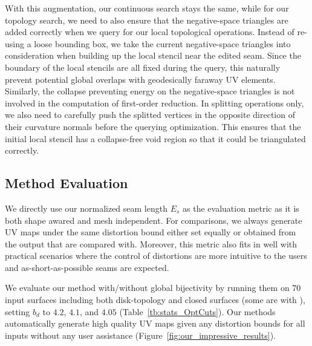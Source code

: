 With this augmentation, our continuous search stays the same, while for our topology search, we need to also ensure that the negative-space triangles are added correctly when we query for our local topological operations.
Instead of re-using a loose bounding box, we take the current negative-space triangles into consideration when building up the local stencil near the edited seam. Since the boundary of the local stencils are all fixed during the query, this naturally prevent potential global overlaps with geodesically faraway UV elements. Similarly, the collapse preventing energy on the negative-space triangles is not involved in the computation of first-order reduction.
In splitting operations only, we also need to carefully push the splitted vertices in the opposite direction of their curvature normals before the querying optimization. This ensures that the initial local stencil has a collapse-free void region so that it could be triangulated correctly.



\subsection{Method Evaluation}

We directly use our normalized seam length $E_{s}$ as the evaluation metric as it is both shape awared and mesh independent. For comparisons, we always generate UV maps under the same distortion bound either set equally or obtained from the output that are compared with.
Moreover, this metric also fits in well with practical scenarios where the control of distortions are more intuitive to the users and as-short-as-possible seams are expected.

We evaluate our method with/without global bijectivity by running them on 70 input surfaces including both disk-topology and closed surfaces (some are with ), setting $b_d$ to $4.2$, $4.1$, and $4.05$ (Table~\ref{tb:stats_OptCuts}). Our methods automatically generate high quality UV maps given any distortion bounds for all inputs without any user assistance (Figure~\ref{fig:our_impressive_results}).

